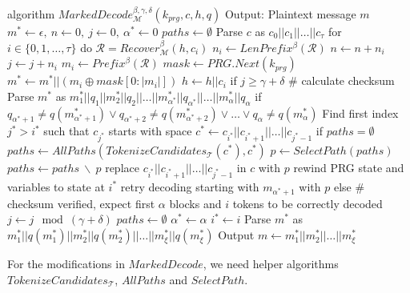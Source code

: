 \begin{Pseudocode}[caption={
$MarkedDecode$ algorithm.
In comparison to Meteor's $Decode$ algorithm, $MarkedDecode$ verifies the checksums $q(m_i)$ of blocks $m_i$.
If the checksum does not match, a decoding error occured.
It then performs a lookbehind on the stegotext and generates all possible tokenizations $paths$ for a substring of $c$.
Afterwards, rewind the internal state and retry decoding with a path $p$ selected from $paths$.
}, label={alg:marked-decode}]
algorithm $MarkedDecode_{\mathcal{M}}^{\beta,\gamma,\delta}(k_{prg}, c, h, q)$
  Output: Plaintext message $m$
  $m^* \leftarrow \epsilon,~ n \leftarrow 0,~ j \leftarrow 0,~ \alpha^* \leftarrow 0$
  $paths \leftarrow \emptyset$
  Parse $c$ as $c_0 || c_1 || \dots || c_{\tau}$
  for $i \in \{ 0, 1, \dots, \tau \}$ do
    $\mathcal{R} = Recover_{\mathcal{M}}^\beta(h, c_i)$
    $n_i \leftarrow LenPrefix^\beta(\mathcal{R})$
    $n \leftarrow n + n_i$
    $j \leftarrow j + n_i$
    $m_i \leftarrow Prefix^\beta(\mathcal{R})$
    $mask \leftarrow PRG.Next(k_{prg})$
    $m^* \leftarrow m^* || (m_i \oplus mask[0: |m_i|])$
    $h \leftarrow h||c_i$
    if $j \geq \gamma + \delta$
      # calculate checksum
      Parse $m^*$ as $m^*_1||q_1||m^*_2||q_2||\dots||m^*_{\alpha^*}||q_{\alpha^*}||\dots||m^*_\alpha||q_\alpha$
      if $q_{\alpha^*+1} \neq q(m^*_{\alpha^*+1}) \lor q_{\alpha^*+2} \neq q(m^*_{\alpha^*+2}) \lor \dots \lor q_\alpha \neq q(m^*_\alpha)$
        Find first index $j^* > i^*$ such that $c_{j^*}$ starts with space
        $c^* \leftarrow c_{i^*} || c_{i^*+1} || \dots || c_{j^*-1}$
        if $paths = \emptyset$
          $paths \leftarrow AllPaths(TokenizeCandidates_{\mathcal{T}}(c^*), c^*)$
        $p \leftarrow SelectPath(paths)$
        $paths \leftarrow paths~ \backslash~ p$
        replace $c_{i^*}||c_{i^*+1}||\dots||c_{j^*-1}$ in $c$ with $p$
        rewind PRG state and variables to state at $i^*$
        retry decoding starting with $m_{\alpha^*+1}$ with $p$
      else  # checksum verified, expect first $\alpha$ blocks and $i$ tokens to be correctly decoded
        $j \leftarrow j \mod (\gamma+\delta)$
        $paths \leftarrow \emptyset$
        $\alpha^* \leftarrow \alpha$
        $i^* \leftarrow i$
  Parse $m^*$ as $m^*_1||q(m^*_1)||m^*_2||q(m^*_2)||\dots||m^*_\xi||q(m^*_\xi)$
  Output $m \leftarrow m^*_1||m^*_2||\dots||m^*_\xi$
\end{Pseudocode}

For the modifications in $MarkedDecode$, we need helper algorithms $TokenizeCandidates_{\mathcal{T}}$, $AllPaths$ and $SelectPath$.

